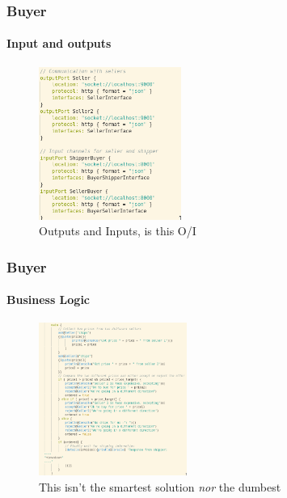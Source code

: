 \documentclass{beamer}
\begin{document}
    \begin{frame}[t]
        \frametitle{Buyer}
        \framesubtitle{Input and outputs}
\begin{figure}[!h]
    \centering
    \includegraphics[height=5cm]{images2/buyerio.png}
    \caption{Outputs and Inputs, is this O/I}
    \label{fig:a2p1}
\end{figure}
    \end{frame}
    \begin{frame}[t]
        \frametitle{Buyer}
        \framesubtitle{Business Logic}
\begin{figure}[!h]
    \centering
    \includegraphics[height=5cm]{images2/buyerlogic.png}
    \caption{This isn't the smartest solution \emph{nor} the dumbest}
    \label{fig:a2p1}
\end{figure}
    \end{frame}
\end{document}
